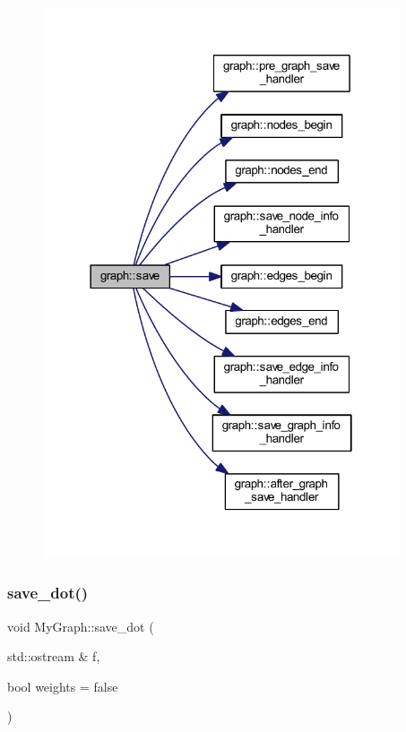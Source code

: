 \nopagebreak
\begin{figure}[H]
\begin{center}
\leavevmode
\includegraphics[width=298pt]{classgraph_ad53bd0f3c96616b7f2d44abdce3df6de_cgraph}
\end{center}
\end{figure}
\mbox{\label{class_my_graph_acf68ca166eebb43a80b722c6ef15d22c}} 
\subsubsection{\texorpdfstring{save\+\_\+dot()}{save\_dot()}\hspace{0.1cm}{\footnotesize\ttfamily [1/2]}}
{\footnotesize\ttfamily void My\+Graph\+::save\+\_\+dot (\begin{DoxyParamCaption}\item[{std\+::ostream \&}]{f,  }\item[{bool}]{weights = {\ttfamily false} }\end{DoxyParamCaption})\hspace{0.3cm}{\ttfamily [virtual]}}


